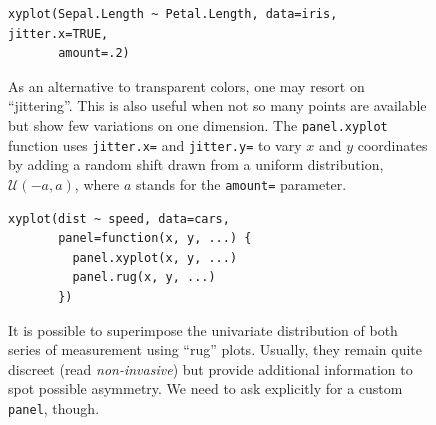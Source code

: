 \documentclass[a4paper,twoside]{book}
\newcounter{fig}
\newcommand{\img}[1]{\texttt{[image: \#1]}\stepcounter{fig}}
\renewcommand{\texttt}[1]{\lstinline{#1}}
\begin{document}
\begin{figure}[H]
\begin{lstlisting}
xyplot(Sepal.Length ~ Petal.Length, data=iris, jitter.x=TRUE, 
       amount=.2)
\end{lstlisting}
  \fcapside[\FBwidth] {\img{figs_lattice-crop}}
  {\caption*{As an alternative to
      transparent colors, one may resort on ``jittering''. This is
      also useful when not so many points are available but show few
      variations on one dimension. The \texttt{panel.xyplot} function
      uses \texttt{jitter.x=} and \texttt{jitter.y=} to vary $x$ and
      $y$ coordinates by adding a random shift drawn from a uniform
      distribution, $\mathcal{U}(-a,a)$, where $a$ stands for the
      \texttt{amount=} parameter.}}
\end{figure}






\begin{figure}[H]
\begin{lstlisting}
xyplot(dist ~ speed, data=cars,
       panel=function(x, y, ...) {
         panel.xyplot(x, y, ...)
         panel.rug(x, y, ...)
       })
\end{lstlisting}
\fcapside[\FBwidth]
{\img{figs_lattice-crop}}
{\caption*{It is possible to superimpose the univariate distribution
    of both series of measurement using ``rug'' plots. Usually, they
    remain quite discreet (read \emph{non-invasive}) but provide
    additional information to spot possible asymmetry. We need to ask
    explicitly for a custom \texttt{panel}, though.}}
\end{figure}
\end{document}
